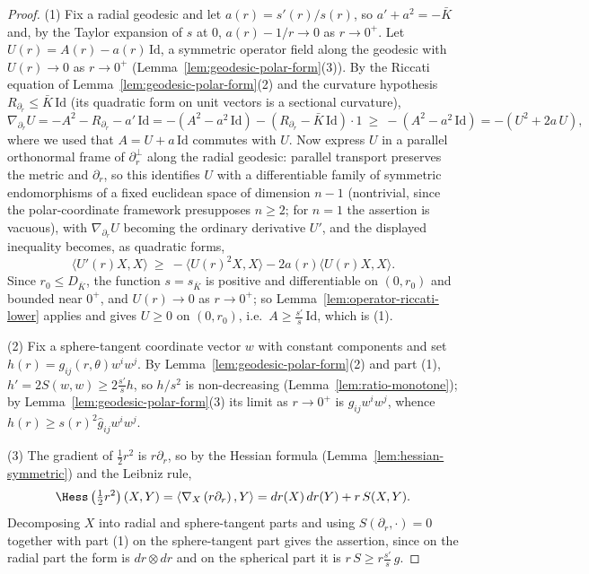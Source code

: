 \begin{proof}
(1) Fix a radial geodesic and let $a(r)=s'(r)/s(r)$, so
$a'+a^2=-\bar K$ and, by the Taylor expansion of $s$ at $0$,
$a(r)-1/r\to0$ as $r\to0^+$. Let $U(r)=A(r)-a(r)\,\mathrm{Id}$, a
symmetric operator field along the geodesic with $U(r)\to0$ as
$r\to0^+$ (Lemma~\ref{lem:geodesic-polar-form}(3)). By the Riccati
equation of Lemma~\ref{lem:geodesic-polar-form}(2) and the
curvature hypothesis $R_{\partial_r}\le\bar K\,\mathrm{Id}$ (its
quadratic form on unit vectors is a sectional curvature),
$$\nabla_{\partial_r}U=-A^2-R_{\partial_r}-a'\,\mathrm{Id}
=-\left(A^2-a^2\,\mathrm{Id}\right)-\left(R_{\partial_r}
-\bar K\,\mathrm{Id}\right)\cdot 1
\ \ge\ -\left(A^2-a^2\,\mathrm{Id}\right)
=-\left(U^2+2a\,U\right),$$
where we used that $A=U+a\,\mathrm{Id}$ commutes with $U$. Now
express $U$ in a parallel orthonormal frame of $\partial_r^\perp$
along the radial geodesic: parallel transport preserves the metric
and $\partial_r$, so this identifies $U$ with a differentiable
family of symmetric endomorphisms of a fixed euclidean space of
dimension $n-1$ (nontrivial, since the polar-coordinate framework
presupposes $n\ge2$; for $n=1$ the assertion is vacuous), with
$\nabla_{\partial_r}U$ becoming the ordinary derivative $U'$, and
the displayed inequality becomes, as quadratic forms,
$$\langle U'(r)X,X\rangle\ \ge\
-\langle U(r)^2X,X\rangle-2a(r)\langle U(r)X,X\rangle .$$
Since $r_0\le D_{\bar K}$, the function $s=s_{\bar K}$ is positive
and differentiable on $(0,r_0)$ and bounded near $0^+$, and
$U(r)\to0$ as $r\to0^+$; so
Lemma~\ref{lem:operator-riccati-lower} applies and gives $U\ge0$
on $(0,r_0)$, i.e.\ $A\ge\frac{s'}{s}\,\mathrm{Id}$, which is
(1).

(2) Fix a sphere-tangent coordinate vector $w$ with constant
components and set $h(r)=g_{ij}(r,\theta)w^iw^j$. By
Lemma~\ref{lem:geodesic-polar-form}(2) and part (1),
$h'=2S(w,w)\ge2\frac{s'}{s}h$, so $h/s^2$ is non-decreasing
(Lemma~\ref{lem:ratio-monotone}); by
Lemma~\ref{lem:geodesic-polar-form}(3) its limit as $r\to0^+$ is
$\hat g_{ij}w^iw^j$, whence $h(r)\ge s(r)^2\hat g_{ij}w^iw^j$.

(3) The gradient of $\frac12r^2$ is $r\partial_r$, so by the
Hessian formula (Lemma~\ref{lem:hessian-symmetric}) and the Leibniz
rule,
$$\Hess\left(\tfrac12r^2\right)(X,Y)
=\left\langle\nabla_X\left(r\partial_r\right),Y\right\rangle
=dr(X)\,dr(Y)+r\,S(X,Y).$$
Decomposing $X$ into radial and sphere-tangent parts and using
$S(\partial_r,\cdot)=0$ together with part (1) on the
sphere-tangent part gives the assertion, since on the radial part
the form is $dr\otimes dr$ and on the spherical part it is $r\,S\ge
r\frac{s'}{s}\,g$.
\end{proof}

